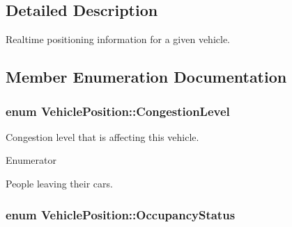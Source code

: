 \subsection{Detailed Description}
Realtime positioning information for a given vehicle. 

\subsection{Member Enumeration Documentation}
\subsubsection[{\texorpdfstring{Congestion\+Level}{CongestionLevel}}]{\setlength{\rightskip}{0pt plus 5cm}enum {\bf Vehicle\+Position\+::\+Congestion\+Level}}\hypertarget{structVehiclePosition_a6b68a02175508df528c0fb3dfc52c7c5}{}\label{structVehiclePosition_a6b68a02175508df528c0fb3dfc52c7c5}


Congestion level that is affecting this vehicle. 

\begin{Desc}
\item[Enumerator]\par
\begin{description}
\item[{\em 
S\+E\+V\+E\+R\+E\+\_\+\+C\+O\+N\+G\+E\+S\+T\+I\+ON\hypertarget{structVehiclePosition_a6b68a02175508df528c0fb3dfc52c7c5a7a9272ea707c92007d42b72957d8d570}{}\label{structVehiclePosition_a6b68a02175508df528c0fb3dfc52c7c5a7a9272ea707c92007d42b72957d8d570}
}]People leaving their cars. \end{description}
\end{Desc}
\subsubsection[{\texorpdfstring{Occupancy\+Status}{OccupancyStatus}}]{\setlength{\rightskip}{0pt plus 5cm}enum {\bf Vehicle\+Position\+::\+Occupancy\+Status}}\hypertarget{structVehiclePosition_a3b7e3ee1e916599ecb7fd088d4f53f0d}{}\label{structVehiclePosition_a3b7e3ee1e916599ecb7fd088d4f53f0d}


